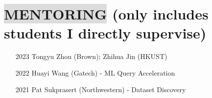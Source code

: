 \section*{
    \colorbox{gainsboro}{MENTORING}  {\small \normalfont (only includes students I directly supervise)}
}
\begin{itemize}[leftmargin=16.5mm,labelsep=9mm,noitemsep]
    \item[2023] Tongyu Zhou (Brown); Zhihua Jin (HKUST)
    \item[2022] Huayi Wang (Gatech) - ML Query Acceleration
    \item[2021] Pat Sukprasert (Northwestern) - Dataset Discovery
\end{itemize}